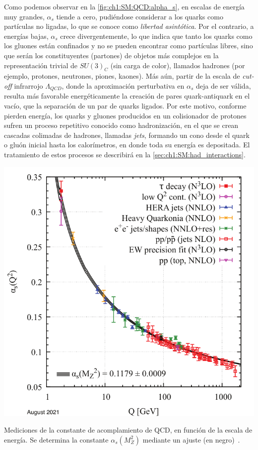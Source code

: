Como podemos observar en la \cref{fig:ch1:SM:QCD:alpha_s}, en escalas de energía muy grandes, $\alpha_s$ tiende a cero, pudiéndose considerar a los quarks como partículas no ligadas, lo que se conoce como \textit{libertad asintótica}. Por el contrario, a energías bajas, $\alpha_s$ crece divergentemente, lo que indica que tanto los quarks como los gluones están confinados y no se pueden encontrar como partículas libres, sino que serán los constituyentes (partones) de objetos más complejos en la representación trivial de $SU(3)_C$ (sin carga de color), llamados hadrones (por ejemplo, protones, neutrones, piones, kaones). Más aún, partir de la escala de \textit{cut-off} infrarrojo $\Lambda_{QCD}$, donde la aproximación perturbativa en $\alpha_s$ deja de ser válida, resulta más favorable energéticamente la creación de pares quark-antiquark en el vacío, que la separación de un par de quarks ligados. Por este motivo, conforme pierden energía, los quarks y gluones producidos en un colisionador de protones sufren un proceso repetitivo conocido como hadronización, en el que se crean cascadas colimadas de hadrones, llamadas \textit{jets}, formando un cono desde el quark o gluón inicial hasta los calorímetros, en donde toda su energía es depositada. El tratamiento de estos procesos se describirá en la \cref{sec:ch1:SM:had_interactions}.

\begin{marginfigure}
  \includegraphics[width=\linewidth]{Assets/Plots/SM/QCD_alpha_s.pdf}
  \caption{Mediciones de la constante de acomplamiento de QCD, en función de la escala de energía. Se determina la constante $\alpha_s(M_Z^2)$ mediante un ajuste (en negro)~.}
  \label{fig:ch1:SM:QCD:alpha_s}
\end{marginfigure}



